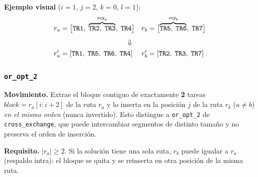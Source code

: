 \noindent\textbf{Ejemplo visual} ($i=1$, $j=2$, $k=0$, $l=1$):
\[
    \begin{array}{ll}
        r_a = \bigl[\mathtt{TR1},\;
                    \overbrace{\mathtt{TR2},\;\mathtt{TR3}}^{\mathit{seg}_a},\;
                    \mathtt{TR4}\bigr]
        &
        r_b = \bigl[\overbrace{\mathtt{TR5},\;\mathtt{TR6}}^{\mathit{seg}_b},\;
                    \mathtt{TR7}\bigr] \\[8pt]
        \multicolumn{2}{c}{\Downarrow} \\[4pt]
        r'_a = [\mathtt{TR1},\;\mathtt{TR5},\;\mathtt{TR6},\;\mathtt{TR4}]
        &
        r'_b = [\mathtt{TR2},\;\mathtt{TR3},\;\mathtt{TR7}]
    \end{array}
\]

\subsubsection{\texttt{or\_opt\_2}}
\label{sssec:or-opt-2}

\textbf{Movimiento.}
Extrae el bloque contiguo de exactamente \textbf{2} tareas
$\mathit{block} = r_a[i{:}i{+}2]$ de la ruta $r_a$ y lo inserta en la
posición $j$ de la ruta $r_b$ ($a \neq b$) \emph{en el mismo orden}
(nunca invertido).  Esto distingue a \texttt{or\_opt\_2} de
\texttt{cross\_exchange}, que puede intercambiar segmentos de distinto
tamaño y no preserva el orden de inserción.

\textbf{Requisito.} $|r_a| \geq 2$.  Si la solución tiene una sola ruta,
$r_b$ puede igualar a $r_a$ (respaldo intra): el bloque se quita y se
reinserta en otra posición de la misma ruta.

